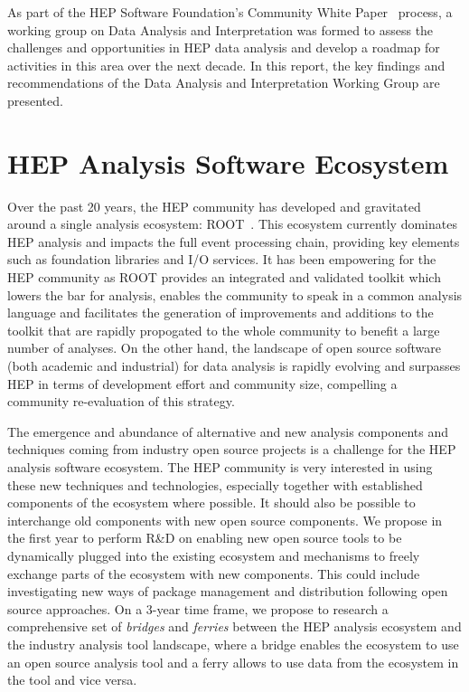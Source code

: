 \documentclass[12pt,a4paper]{article}
\begin{document}
As part of the HEP Software Foundation’s Community White Paper~\cite{HSF-CWP-2017-01} process, a working group on Data Analysis and Interpretation was formed to assess the challenges and opportunities in HEP data analysis and develop a roadmap for activities in this area over the next decade. In this report, the key findings and recommendations of the Data Analysis and Interpretation Working Group are presented.

\section{HEP Analysis Software Ecosystem}

Over the past 20 years, the HEP community has developed and gravitated around a single analysis ecosystem: ROOT~\cite{Brun1996}. This ecosystem currently dominates HEP analysis and impacts the full event processing chain, providing key elements such as foundation libraries and I/O services. It has been empowering for the HEP community as ROOT provides an integrated and validated toolkit which lowers the bar for analysis, enables the community to speak in a common analysis language and facilitates the generation of improvements and additions to the toolkit that are rapidly propogated to the whole community to benefit a large number of analyses. On the other hand, the landscape of open source software (both academic and industrial) for data analysis is rapidly evolving and surpasses HEP in terms of development effort and community size, compelling a community re-evaluation of this strategy.

The emergence and abundance of alternative and new analysis components and techniques coming from industry open source projects is a challenge for the HEP analysis software ecosystem. The HEP community is very interested in using these new techniques and technologies, especially together with established components of the ecosystem where possible. It should also be possible to interchange old components with new open source components. We propose in the first year to perform R\&D on enabling new open source tools to be dynamically plugged into the existing ecosystem and mechanisms to freely exchange parts of the ecosystem with new components. This could include investigating new ways of package management and distribution following open source approaches. On a 3-year time frame, we propose to research a comprehensive set of {\it bridges} and {\it ferries} between the HEP analysis ecosystem and the industry analysis tool landscape, where a bridge enables the ecosystem to use an open source analysis tool and a ferry allows to use data from the ecosystem in the tool and vice versa.
\end{document}
